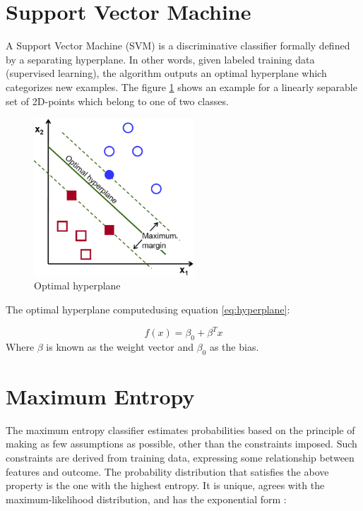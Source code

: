 
\section{Support Vector Machine}
A Support Vector Machine (SVM) is a discriminative classifier formally defined by a separating hyperplane. In other words, given labeled training data (supervised learning), the algorithm outputs an optimal hyperplane which categorizes new examples.
The figure \ref{fig:hyperplane} shows an example for a linearly separable set of 2D-points which belong to one of two classes.
\begin{figure}[H]
  \centering
  \includegraphics[width=60mm]{figures/optimal-hyperplane.png}
  \caption{Optimal hyperplane \label{fig:hyperplane}}
\end{figure}
The optimal hyperplane computedusing equation \ref{eq:hyperplane}:

\begin{equation}
\label{eq:hyperplane}
f(x) = \beta_{0} + \beta^{T} x
\end{equation}
Where $\beta$ is known as the weight vector and $\beta_{0}$ as the bias.


\section{Maximum Entropy}
The maximum entropy classifier estimates probabilities
based on the principle of making as few
assumptions as possible, other than the constraints
imposed. Such constraints are derived from training
data, expressing some relationship between features
and outcome. The probability distribution
that satisfies the above property is the one with
the highest entropy. It is unique, agrees with the
maximum-likelihood distribution, and has the exponential
form :

